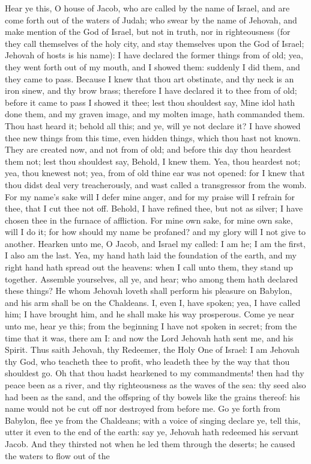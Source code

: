 Hear ye this, O house of Jacob, who are called by the name of Israel, and are come forth out of the waters of Judah; who swear by the name of Jehovah, and make mention of the God of Israel, but not in truth, nor in righteousness (for they call themselves of the holy city, and stay themselves upon the God of Israel; Jehovah of hosts is his name): I have declared the former things from of old; yea, they went forth out of my mouth, and I showed them: suddenly I did them, and they came to pass. Because I knew that thou art obstinate, and thy neck is an iron sinew, and thy brow brass; therefore I have declared it to thee from of old; before it came to pass I showed it thee; lest thou shouldest say, Mine idol hath done them, and my graven image, and my molten image, hath commanded them. Thou hast heard it; behold all this; and ye, will ye not declare it? I have showed thee new things from this time, even hidden things, which thou hast not known. They are created now, and not from of old; and before this day thou heardest them not; lest thou shouldest say, Behold, I knew them. Yea, thou heardest not; yea, thou knewest not; yea, from of old thine ear was not opened: for I knew that thou didst deal very treacherously, and wast called a transgressor from the womb. For my name’s sake will I defer mine anger, and for my praise will I refrain for thee, that I cut thee not off. Behold, I have refined thee, but not as silver; I have chosen thee in the furnace of affliction. For mine own sake, for mine own sake, will I do it; for how should my name be profaned? and my glory will I not give to another.  Hearken unto me, O Jacob, and Israel my called: I am he; I am the first, I also am the last. Yea, my hand hath laid the foundation of the earth, and my right hand hath spread out the heavens: when I call unto them, they stand up together. Assemble yourselves, all ye, and hear; who among them hath declared these things? He whom Jehovah loveth shall perform his pleasure on Babylon, and his arm shall be on the Chaldeans. I, even I, have spoken; yea, I have called him; I have brought him, and he shall make his way prosperous. Come ye near unto me, hear ye this; from the beginning I have not spoken in secret; from the time that it was, there am I: and now the Lord Jehovah hath sent me, and his Spirit.  Thus saith Jehovah, thy Redeemer, the Holy One of Israel: I am Jehovah thy God, who teacheth thee to profit, who leadeth thee by the way that thou shouldest go. Oh that thou hadst hearkened to my commandments! then had thy peace been as a river, and thy righteousness as the waves of the sea: thy seed also had been as the sand, and the offspring of thy bowels like the grains thereof: his name would not be cut off nor destroyed from before me.  Go ye forth from Babylon, flee ye from the Chaldeans; with a voice of singing declare ye, tell this, utter it even to the end of the earth: say ye, Jehovah hath redeemed his servant Jacob. And they thirsted not when he led them through the deserts; he caused the waters to flow out of the 